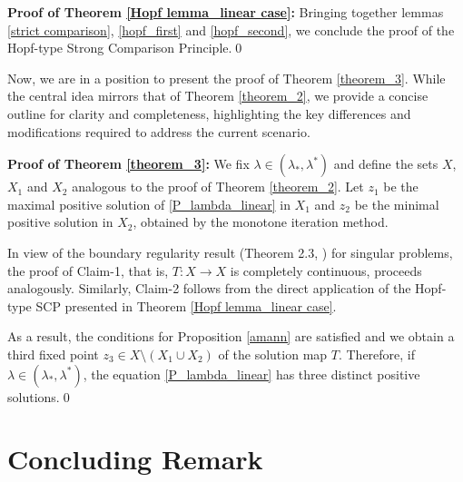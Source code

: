 \documentclass[reqno,oneside]{amsart}
\theoremstyle{definition}
\theoremstyle{remark}
\numberwithin{equation}{section}
\newcommand{\la} {\lambda}
\newcommand{\rar}{\rightarrow}
\begin{document}
\noindent\textbf{Proof of Theorem \ref{Hopf lemma_linear case}:} Bringing together lemmas \ref{strict comparison}, \ref{hopf_first} and \ref{hopf_second}, we conclude the proof of the Hopf-type Strong Comparison Principle.\hfill\qed

Now, we are in a position to present the proof of Theorem \ref{theorem_3}. While the central idea mirrors that of Theorem \ref{theorem_2}, we provide a concise outline for clarity and completeness, highlighting the key differences and modifications required to address the current scenario.

\noindent\textbf{Proof of Theorem \ref{theorem_3}:} We fix $\la\in (\la_*, \la^*)$ and define the sets $X$, $X_1$ and $X_2$ analogous to the proof of Theorem \ref{theorem_2}. Let $z_1$ be the maximal positive solution of \eqref{P_lambda_linear} in $X_1$ and $z_2$ be the minimal positive solution in $X_2$, obtained by the monotone iteration method.

In view of the boundary regularity result (Theorem 2.3, \cite{dhanya2024interiorboundaryregularitymixed}) for singular problems, the proof of Claim-1, that is, $T: X \rar X$ is completely continuous, proceeds analogously. Similarly, Claim-2 follows from the direct application of the Hopf-type SCP presented in Theorem \ref{Hopf lemma_linear case}.

As a result, the conditions for Proposition \ref{amann} are satisfied and we obtain a third fixed point $z_3 \in X \setminus (X_1 \cup X_2)$ of the solution map $T$. Therefore, if $\la\in (\la_*, \la^*)$, the equation \eqref{P_lambda_linear} has three distinct positive solutions.\hfill\qed


\section{Concluding Remark}
\end{document}
